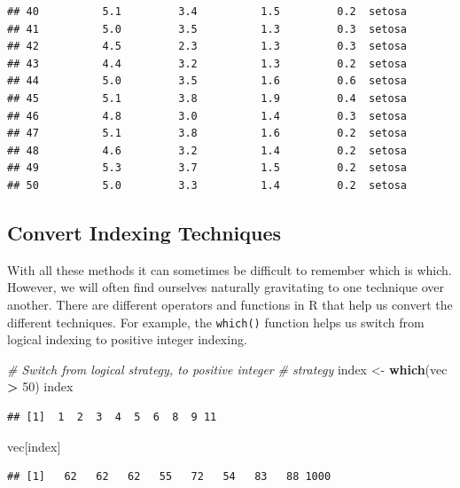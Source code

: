 \documentclass[
]{book}
\newenvironment{Shaded}{\begin{snugshade}}{\end{snugshade}}
\newcommand{\CommentTok}[1]{\textcolor[rgb]{0.56,0.35,0.01}{\textit{#1}}}
\newcommand{\DecValTok}[1]{\textcolor[rgb]{0.00,0.00,0.81}{#1}}
\newcommand{\KeywordTok}[1]{\textcolor[rgb]{0.13,0.29,0.53}{\textbf{#1}}}
\newcommand{\NormalTok}[1]{#1}
\newcommand{\OperatorTok}[1]{\textcolor[rgb]{0.81,0.36,0.00}{\textbf{#1}}}
\newcommand{\StringTok}[1]{\textcolor[rgb]{0.31,0.60,0.02}{#1}}
\begin{document}
\begin{verbatim}
## 40          5.1         3.4          1.5         0.2  setosa
## 41          5.0         3.5          1.3         0.3  setosa
## 42          4.5         2.3          1.3         0.3  setosa
## 43          4.4         3.2          1.3         0.2  setosa
## 44          5.0         3.5          1.6         0.6  setosa
## 45          5.1         3.8          1.9         0.4  setosa
## 46          4.8         3.0          1.4         0.3  setosa
## 47          5.1         3.8          1.6         0.2  setosa
## 48          4.6         3.2          1.4         0.2  setosa
## 49          5.3         3.7          1.5         0.2  setosa
## 50          5.0         3.3          1.4         0.2  setosa
\end{verbatim}

\hypertarget{convert-indexing-techniques}{%
\subsection{Convert Indexing Techniques}\label{convert-indexing-techniques}}

With all these methods it can sometimes be difficult to remember which is which. However, we will often find ourselves naturally gravitating to one technique over another. There are different operators and functions in R that help us convert the different techniques. For example, the \texttt{which()} function helps us switch from logical indexing to positive integer indexing.

\begin{Shaded}
\begin{Highlighting}[]
\CommentTok{# Switch from logical strategy, to positive integer}
\CommentTok{# strategy}
\NormalTok{index <-}\StringTok{ }\KeywordTok{which}\NormalTok{(vec }\OperatorTok{>}\StringTok{ }\DecValTok{50}\NormalTok{)}
\NormalTok{index}
\end{Highlighting}
\end{Shaded}

\begin{verbatim}
## [1]  1  2  3  4  5  6  8  9 11
\end{verbatim}

\begin{Shaded}
\begin{Highlighting}[]
\NormalTok{vec[index]}
\end{Highlighting}
\end{Shaded}

\begin{verbatim}
## [1]   62   62   62   55   72   54   83   88 1000
\end{verbatim}
\end{document}
